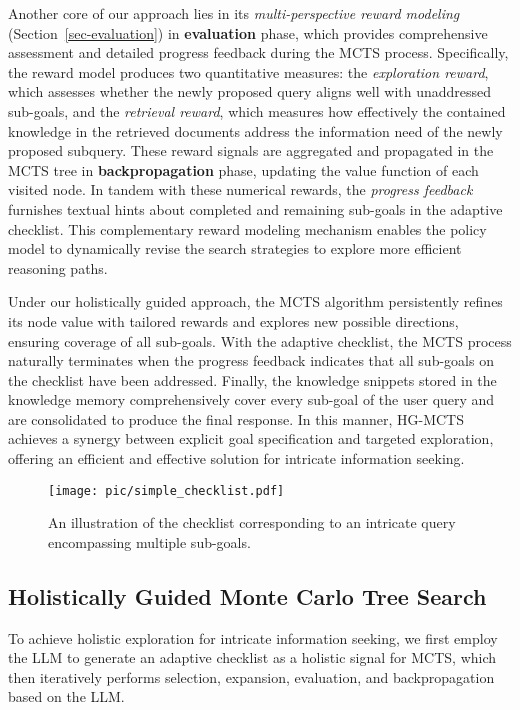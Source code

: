 Another core of our approach lies in its \emph{multi-perspective reward modeling} (Section~\ref{sec-evaluation}) in \textbf{evaluation} phase, which provides comprehensive assessment and detailed progress feedback during the MCTS process. Specifically, the reward model produces two quantitative measures: the \emph{exploration reward}, which assesses whether the newly proposed query aligns well with unaddressed sub-goals, and the \emph{retrieval reward}, which measures how effectively the contained knowledge in the retrieved documents address the information need of the newly proposed subquery. These reward signals are aggregated and propagated in the MCTS tree in \textbf{backpropagation} phase, updating the value function of each visited node. In tandem with these numerical rewards, the \emph{progress feedback} furnishes textual hints about completed and remaining sub-goals in the adaptive checklist. This complementary reward modeling mechanism enables the policy model to dynamically revise the search strategies to explore more efficient reasoning paths.

Under our holistically guided approach, the MCTS algorithm persistently refines its node value with tailored rewards and explores new possible directions, ensuring coverage of all sub-goals. With the adaptive checklist, the MCTS process naturally terminates when the progress feedback indicates that all sub-goals on the checklist have been addressed. Finally, the knowledge snippets stored in the knowledge memory comprehensively cover every sub-goal of the user query and are consolidated to produce the final response. In this manner, {HG-MCTS} achieves a synergy between explicit goal specification and targeted exploration, offering an efficient and effective solution for intricate information seeking.


\begin{figure}
    \centering
    \texttt{[image: pic/simple\_checklist.pdf]}
    \caption{An illustration of the checklist corresponding to an intricate query encompassing multiple sub-goals. 
    }
    \label{fig:checklist}
\end{figure}


\subsection{Holistically Guided Monte Carlo Tree Search}

To achieve holistic exploration for intricate information seeking, we first employ the LLM to generate an adaptive checklist as a holistic signal for MCTS, which then iteratively performs selection, expansion, evaluation, and backpropagation based on the LLM.

